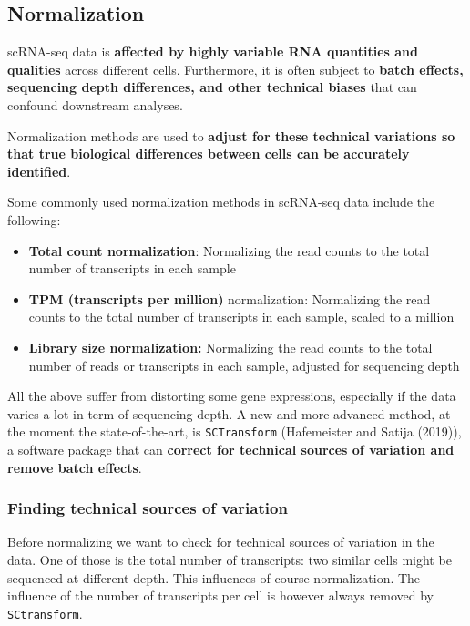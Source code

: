 \documentclass[
  letterpaper,
  DIV=11,
  numbers=noendperiod]{scrartcl}
\providecommand{\tightlist}{%
  \setlength{\itemsep}{0pt}\setlength{\parskip}{0pt}}\usepackage{longtable,booktabs,array}
\begin{document}
\subsection{Normalization}\label{normalization}

scRNA-seq data is \textbf{affected by highly variable RNA quantities and
qualities} across different cells. Furthermore, it is often subject to
\textbf{batch effects, sequencing depth differences, and other technical
biases} that can confound downstream analyses.

Normalization methods are used to \textbf{adjust for these technical
variations so that true biological differences between cells can be
accurately identified}.

Some commonly used normalization methods in scRNA-seq data include the
following:

\begin{itemize}
\tightlist
\item
  \textbf{Total count normalization}: Normalizing the read counts to the
  total number of transcripts in each sample
\item
  \textbf{TPM (transcripts per million)} normalization: Normalizing the
  read counts to the total number of transcripts in each sample, scaled
  to a million
\item
  \textbf{Library size normalization:} Normalizing the read counts to
  the total number of reads or transcripts in each sample, adjusted for
  sequencing depth
\end{itemize}

All the above suffer from distorting some gene expressions, especially
if the data varies a lot in term of sequencing depth. A new and more
advanced method, at the moment the state-of-the-art, is
\texttt{SCTransform} (Hafemeister and Satija (2019)), a software package
that can \textbf{correct for technical sources of variation and remove
batch effects}.

\subsubsection{Finding technical sources of
variation}\label{finding-technical-sources-of-variation}

Before normalizing we want to check for technical sources of variation
in the data. One of those is the total number of transcripts: two
similar cells might be sequenced at different depth. This influences of
course normalization. The influence of the number of transcripts per
cell is however always removed by \texttt{SCtransform}.
\end{document}
